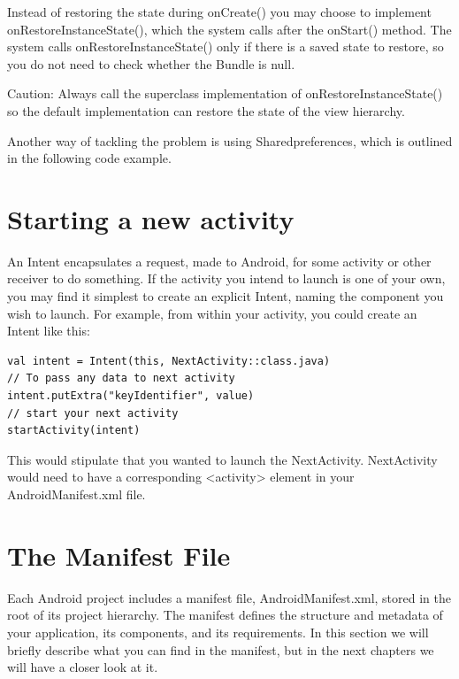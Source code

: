 Instead of restoring the state during onCreate() you may choose to implement onRestoreInstanceState(), which the system calls after the onStart() method. The system calls onRestoreInstanceState() only if there is a saved state to restore, so you do not need to check whether the Bundle is null.

Caution: Always call the superclass implementation of onRestoreInstanceState() so the default implementation can restore the state of the view hierarchy.

Another way of tackling the problem is using Sharedpreferences, which is outlined in the following code example. 







\section{Starting a new activity}
An Intent encapsulates a request, made to Android, for some activity or other
receiver to do something. If the activity you intend to launch is one of your own, you may find it simplest to
create an explicit Intent, naming the component you wish to launch. For example,
from within your activity, you could create an Intent like this:

\begin{lstlisting}
val intent = Intent(this, NextActivity::class.java)
// To pass any data to next activity
intent.putExtra("keyIdentifier", value)
// start your next activity
startActivity(intent)
\end{lstlisting}


This would stipulate that you wanted to launch the NextActivity. NextActivity
would need to have a corresponding <activity> element in your
AndroidManifest.xml file.

\section{The Manifest File}
Each Android project includes a manifest file, AndroidManifest.xml, stored in the root of its project hierarchy. The manifest defines the structure and metadata of your application, its components, and its requirements. In this section we will briefly describe what you can find in the manifest, but in the next chapters we will have a closer look at it.

